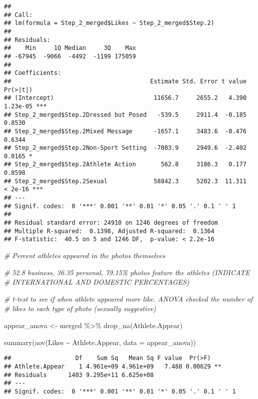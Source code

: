 \documentclass[
]{article}
\newenvironment{Shaded}{\begin{snugshade}}{\end{snugshade}}
\newcommand{\AttributeTok}[1]{\textcolor[rgb]{0.77,0.63,0.00}{#1}}
\newcommand{\CommentTok}[1]{\textcolor[rgb]{0.56,0.35,0.01}{\textit{#1}}}
\newcommand{\FunctionTok}[1]{\textcolor[rgb]{0.00,0.00,0.00}{#1}}
\newcommand{\NormalTok}[1]{#1}
\newcommand{\OtherTok}[1]{\textcolor[rgb]{0.56,0.35,0.01}{#1}}
\newcommand{\SpecialCharTok}[1]{\textcolor[rgb]{0.00,0.00,0.00}{#1}}
\begin{document}
\begin{verbatim}
## 
## Call:
## lm(formula = Step_2_merged$Likes ~ Step_2_merged$Step.2)
## 
## Residuals:
##    Min     1Q Median     3Q    Max 
## -67945  -9066  -4492  -1199 175059 
## 
## Coefficients:
##                                       Estimate Std. Error t value Pr(>|t|)    
## (Intercept)                            11656.7     2655.2   4.390 1.23e-05 ***
## Step_2_merged$Step.2Dressed but Posed   -539.5     2911.4  -0.185   0.8530    
## Step_2_merged$Step.2Mixed Message      -1657.1     3483.6  -0.476   0.6344    
## Step_2_merged$Step.2Non-Sport Setting  -7083.9     2949.6  -2.402   0.0165 *  
## Step_2_merged$Step.2Athlete Action       562.8     3186.3   0.177   0.8598    
## Step_2_merged$Step.2Sexual             58842.3     5202.3  11.311  < 2e-16 ***
## ---
## Signif. codes:  0 '***' 0.001 '**' 0.01 '*' 0.05 '.' 0.1 ' ' 1
## 
## Residual standard error: 24910 on 1246 degrees of freedom
## Multiple R-squared:  0.1398, Adjusted R-squared:  0.1364 
## F-statistic:  40.5 on 5 and 1246 DF,  p-value: < 2.2e-16
\end{verbatim}

\begin{Shaded}
\begin{Highlighting}[]
\CommentTok{\# Percent athletes appeared in the photos themselves}

\CommentTok{\# 52.8 business, 36.35 personal, 79.15\% photos feature the athletes (INDICATE}
\CommentTok{\# INTERNATIONAL AND DOMESTIC PERCENTAGES)}

\CommentTok{\# t{-}test to see if when athlete appeared more like. ANOVA checked the number of }
\CommentTok{\# likes to each type of photo (sexually suggestive)}

\NormalTok{appear\_anova }\OtherTok{\textless{}{-}}\NormalTok{ merged }\SpecialCharTok{\%\textgreater{}\%}
  \FunctionTok{drop\_na}\NormalTok{(Athlete.Appear)}

\FunctionTok{summary}\NormalTok{(}\FunctionTok{aov}\NormalTok{(Likes }\SpecialCharTok{\textasciitilde{}}\NormalTok{ Athlete.Appear, }\AttributeTok{data =}\NormalTok{ appear\_anova))}
\end{Highlighting}
\end{Shaded}

\begin{verbatim}
##                  Df    Sum Sq   Mean Sq F value  Pr(>F)   
## Athlete.Appear    1 4.961e+09 4.961e+09   7.488 0.00629 **
## Residuals      1403 9.295e+11 6.625e+08                   
## ---
## Signif. codes:  0 '***' 0.001 '**' 0.01 '*' 0.05 '.' 0.1 ' ' 1
\end{verbatim}
\end{document}
